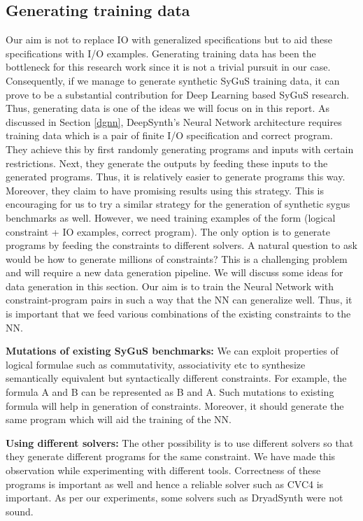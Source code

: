 \subsection{Generating training data}
Our aim is not to replace IO with generalized specifications but to aid these specifications with I/O examples.
Generating training data has been the bottleneck for this research work since it is not a trivial pursuit in our case.
Consequently, if we manage to generate synthetic SyGuS training data, it can prove to be a substantial contribution for Deep Learning based SyGuS research. Thus, generating data is one of the ideas we will focus on in this report. 
As discussed in Section \ref{dgnn}, DeepSynth's Neural Network architecture requires training data which is a pair of finite I/O specification and correct program. They achieve this by first randomly generating programs and inputs with certain restrictions.  Next, they generate the outputs by feeding these inputs to the generated programs. Thus, it is relatively easier to generate programs this way. Moreover, they claim to have promising results using this strategy.
This is encouraging for us to try a similar strategy for the generation of synthetic sygus benchmarks as well. However, we need training examples of the form (logical constraint + IO examples, correct program). The only option is to generate programs by feeding the constraints to different solvers. A natural question to ask would be how to generate millions of constraints? This is a challenging problem and will require a new data generation pipeline. We will discuss some ideas for data generation in this section.
Our aim is to train the Neural Network with constraint-program pairs in such a way that the NN can generalize well. Thus, it is important that we feed various combinations of the existing constraints to the NN.

\smallskip
\noindent\textbf{Mutations of existing SyGuS benchmarks:}
We can exploit properties of logical formulae such as commutativity, associativity etc to synthesize semantically equivalent but syntactically different constraints. For example, the formula A and B can be represented as B and A. Such mutations to existing formula will help in generation of constraints. Moreover, it should generate the same program which will aid the training of the NN.

\smallskip
\noindent\textbf{Using different solvers:}
The other possibility is to use different solvers so that they generate different programs for the same constraint. We have made this observation while experimenting with different tools. Correctness of these programs is important as well and hence a reliable solver such as CVC4 is important. As per our experiments, some solvers such as DryadSynth were not sound.

